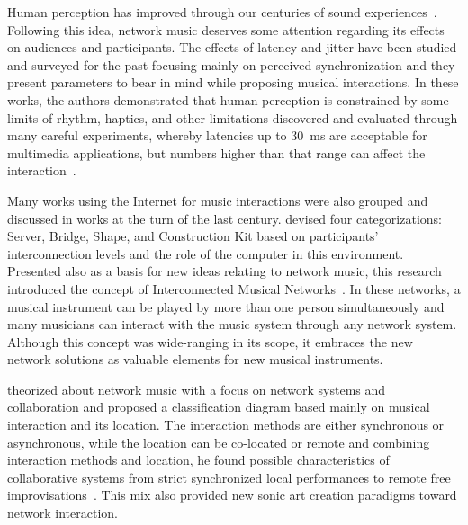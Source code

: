 Human perception has improved through our centuries of sound experiences~\citep{Jourdain1997music}.
Following this idea, network music deserves some attention regarding its effects on audiences and participants.
The effects of latency and jitter have been studied and surveyed for the past focusing mainly on perceived synchronization and they present parameters to bear in mind while proposing musical interactions.
In these works, the authors demonstrated that human perception is constrained by some limits of rhythm, haptics, and other limitations discovered and evaluated through many careful experiments, whereby latencies up to 30~ms are acceptable for multimedia applications, but numbers higher than that range can affect the interaction~\citep{Schuett2002effects,Lago2004thequest,Rottondi2016overview}.

Many works using the Internet for music interactions were also grouped and discussed in works at the turn of the last century.
\cite{Weinberg2003} devised four categorizations: Server, Bridge, Shape, and Construction Kit based on participants' interconnection levels and the role of the computer in this environment.
Presented also as a basis for new ideas relating to network music, this research introduced the concept of Interconnected Musical Networks~\citep{Weinberg2005interconnected}. 
In these networks, a musical instrument can be played by more than one person simultaneously and many musicians can interact with the music system through any network system.
Although this concept was wide-ranging in its scope, it embraces the new network solutions as valuable elements for new musical instruments.

\cite{Barbosa2003dispacedsoundscapes} theorized about network music with a focus on network systems and collaboration and proposed a classification diagram based mainly on musical interaction and its location.
The interaction methods are either synchronous or asynchronous, while the location can be co-located or remote and combining interaction methods and location, he found possible characteristics of collaborative systems from strict synchronized local performances to remote free improvisations~\citep{Barbosa2003dispacedsoundscapes}.
This mix also provided new sonic art creation paradigms toward network interaction.

